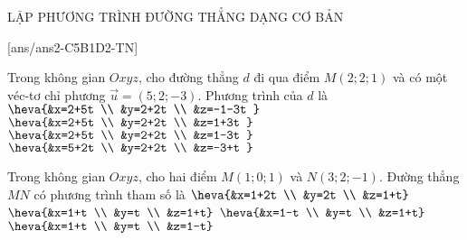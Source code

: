 \begin{dang}{LẬP PHƯƠNG TRÌNH ĐƯỜNG THẲNG DẠNG CƠ BẢN}

\end{dang}
\TN
{}[ans/ans2-C5B1D2-TN]
\begin{ex}%
	Trong không gian $Oxyz$, cho đường thẳng $d$ đi qua điểm $M(2; 2; 1)$ và có một véc-tơ chỉ phương $\overrightarrow{u}=(5; 2;-3)$. Phương trình của $d$ là
	\choice
	{$\heva{&x=2+5t \\
			&y=2+2t \\
			&z=-1-3t
		}$}
	{$\heva{&x=2+5t \\
			&y=2+2t \\
			&z=1+3t
		}$}
	{\True $\heva{&x=2+5t \\
			&y=2+2t \\
			&z=1-3t
		}$}
	{$\heva{&x=5+2t \\
			&y=2+2t \\
			&z=-3+t
		}$}
\end{ex}
\begin{ex}%
	Trong không gian $Oxyz$, cho hai điểm $M(1; 0; 1)$ và $N(3; 2;-1)$. Đường thẳng $MN$ có phương trình tham số là
	\choice
	{$\heva{&x=1+2t \\
			&y=2t \\
			&z=1+t}$}
	{$\heva{&x=1+t \\
			&y=t \\
			&z=1+t}$}
	{$\heva{&x=1-t \\
			&y=t \\
			&z=1+t}$}
	{\True $\heva{&x=1+t \\
			&y=t \\
			&z=1-t}$}
\end{ex}
